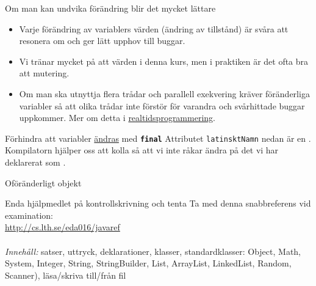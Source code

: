 \documentclass{lecturenotes}
\begin{document}
\begin{Slide}{Om man kan undvika förändring blir det mycket lättare}
\begin{itemize}
\item Varje förändring av variablers värden (ändring av tillstånd) är svåra att resonera om och ger lätt upphov till buggar.
\item Vi tränar mycket på att  värden i denna kurs, men i praktiken är det ofta bra att  mutering.
\item Om man ska utnyttja flera trådar och parallell exekvering kräver föränderliga variabler  så att olika trådar inte förstör för varandra och svårhittade buggar uppkommer. Mer om detta i \href{http://cs.lth.se/eda040}{realtidsprogrammering}.
\end{itemize}
\end{Slide}


\begin{Slide}{Förhindra att variabler \href{https://docs.oracle.com/javase/tutorial/essential/concurrency/immutable.html}{ändras} med \texttt{\textbf{final}}}
Attributet \texttt{latinsktNamn} nedan är en .\\ Kompilatorn hjälper oss att kolla så att vi inte råkar ändra på det vi har deklarerat som .

\end{Slide}

\begin{Slide}{Oföränderligt objekt}

\end{Slide}

\begin{Slide}{Enda hjälpmedlet på kontrollskrivning och tenta}
Ta med denna snabbreferens  vid examination: \\ 
\url{http://cs.lth.se/eda016/javaref} \\ \vspace{1em}
 \\ \vspace{1em}
\textit{Innehåll:} satser, uttryck, deklarationer, klasser, standardklasser: Object, Math, System, Integer, String, StringBuilder, List, ArrayList, LinkedList, Random, Scanner), läsa/skriva till/från fil  
\end{Slide}
\end{document}

